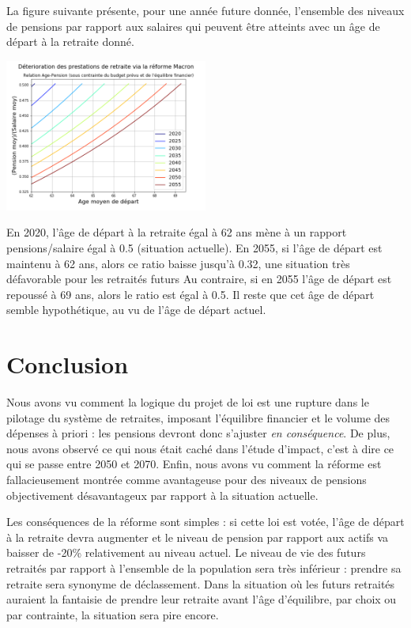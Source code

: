 \documentclass[10pt]{article}
\begin{document}
La figure suivante présente, pour une année future donnée, l'ensemble des niveaux 
de pensions par rapport aux salaires qui peuvent être atteints avec 
un âge de départ à la retraite donné. 

\begin{center}
\includegraphics[width=0.5\textwidth]{Simulation-Age-vs-pensions-vs-date.png}
\end{center}

En 2020, l'âge de départ à la retraite égal à 62 ans 
mène à un rapport pensions/salaire égal à 0.5 (situation actuelle).  
En 2055, si l'âge de départ est maintenu à 62 ans, alors ce ratio baisse jusqu'à 0.32, 
une situation très défavorable pour les retraités futurs
Au contraire, si en 2055 l'âge de départ est repoussé à 69 ans, 
alors le ratio est égal à 0.5. 
Il reste que cet âge de départ semble hypothétique, au vu de l'âge de départ actuel. 


\section{Conclusion}

Nous avons vu comment la logique du projet de loi est une 
rupture dans le pilotage du système de retraites, 
imposant l'équilibre financier et le volume des dépenses 
à priori : les pensions devront donc s'ajuster \emph{en conséquence}. 
De plus, nous avons observé ce qui nous était caché dans l'étude 
d'impact, c'est à dire ce qui se passe entre 2050 et 2070. 
Enfin, nous avons vu comment la réforme est fallacieusement 
montrée comme avantageuse pour des niveaux de pensions 
objectivement désavantageux par rapport à la situation 
actuelle. 

Les conséquences de la réforme sont simples : 
si cette loi est votée, l'âge de départ à la retraite 
devra augmenter et le niveau de pension par rapport aux actifs va 
baisser de -20\% relativement au niveau actuel. 
Le niveau de vie des futurs retraités par rapport à l'ensemble de la 
population sera très inférieur : prendre sa retraite sera synonyme de 
déclassement. 
Dans la situation où les futurs retraités auraient la fantaisie 
de prendre leur retraite avant l'âge d'équilibre, par choix ou par contrainte, 
la situation sera pire encore. 
\end{document}
